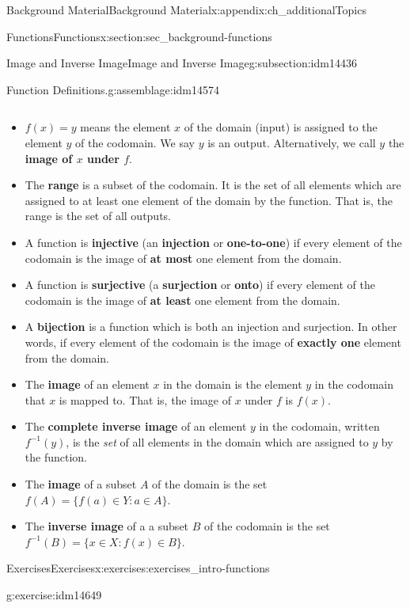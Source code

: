 \documentclass[oneside,10pt,]{book}
\newcommand{\terminology}[1]{\textbf{#1}}
\numberwithin{equation}{chapter}
\def\inv{^{-1}}
\def\st{:}
\begin{document}
\begin{appendixptx}{Background Material}{}{Background Material}{}{}{x:appendix:ch_additionalTopics}
\begin{sectionptx}{Functions}{}{Functions}{}{}{x:section:sec_background-functions}
\begin{subsectionptx}{Image and Inverse Image}{}{Image and Inverse Image}{}{}{g:subsection:idm14436}
\begin{assemblage}{Function Definitions.}{g:assemblage:idm14574}
\begin{itemize}[label=\textbullet]
\begin{equation*}
\end{equation*}
%
\item{}\(f(x) = y\) means the element \(x\) of the domain (input) is assigned to the element \(y\) of the codomain. We say \(y\) is an output. Alternatively, we call \(y\) the \terminology{image of \(x\) under \(f\)}.%
\item{}The \terminology{range} is a subset of the codomain. It is the set of all elements which are assigned to at least one element of the domain by the function. That is, the range is the set of all outputs.%
\item{}A function is \terminology{injective} (an \terminology{injection} or \terminology{one-to-one}) if every element of the codomain is the image of \terminology{at most} one element from the domain.%
\item{}A function is \terminology{surjective} (a \terminology{surjection} or \terminology{onto}) if every element of the codomain is the image of \terminology{at least} one element from the domain.%
\item{}A \terminology{bijection} is a function which is both an injection and surjection. In other words, if every element of the codomain is the image of \terminology{exactly one} element from the domain.%
\item{}The \terminology{image} of an element \(x\) in the domain is the element \(y\) in the codomain that \(x\) is mapped to.  That is, the image of \(x\) under \(f\) is  \(f(x)\).%
\item{}The \terminology{complete inverse image} of an element \(y\) in the codomain, written \(f\inv(y)\), is the \emph{set} of all elements in the domain which are assigned to \(y\) by the function.%
\item{}The \terminology{image} of a subset \(A\) of the domain is the set \(f(A) = \{f(a) \in Y \st a \in A\}\).%
\item{}The \terminology{inverse image} of a a subset \(B\) of the codomain is the set \(f\inv(B) = \{x \in X \st f(x) \in B\}\).%
\end{itemize}
%
\end{assemblage}
\end{subsectionptx}
%
%
\typeout{************************************************}
\typeout{************************************************}
%
\begin{exercises-subsection}{Exercises}{}{Exercises}{}{}{x:exercises:exercises_intro-functions}
\begin{divisionexercise}{1}{}{}{g:exercise:idm14649}%

\end{divisionexercise}
\end{exercises-subsection}
\end{sectionptx}
\end{appendixptx}
\end{document}
